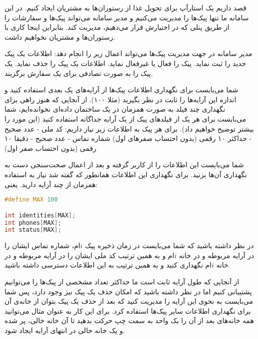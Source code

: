 \documentclass[../main.tex]{subfiles}
\begin{document}

قصد داریم یک استارآپ برای تحویل غذا از رستوران‌ها به مشتریان ایجاد کنیم. در این سامانه ما تنها پیک‌ها را مدیریت می‌کنیم و مدیر سامانه می‌تواند پیک‌ها و سفارشات را از طریق پنلی که در اختیارش قرار می‌دهیم، مدیریت کند.
بنابراین اینجا کاری با رستوران‌ها و مشتریان نخواهیم داشت.

مدیر سامانه در جهت مدیریت پیک‌ها می‌تواند اعمال زیر را انجام دهد:
 اطلاعات یک پیک جدید را ثبت نماید.
 پیک را فعال یا غیرفعال نماید.
 اطلاعات یک پیک را حذف نماید.
 یک پیک را به صورت تصادفی برای یک سفارش برگزیند.

شما می‌بایست برای نگهداری اطلاعات پیک‌ها از آرایه‌های یک بعدی استفاده کنید و اندازه این آرایه‌ها را ثابت در نظر بگیرید (مثلا ۱۰۰). از آنجایی که هنوز راهی برای نگهداری چند فیلد به صورت همزمان در یک ساختمان داده‌ای نخوانده‌ایم، شما می‌بایست برای هر یک از فیلدهای پیک از یک آرایه جداگانه استفاده کنید (این مورد را بیشتر توضیح خواهیم داد).
برای هر پیک به اطلاعات زیر نیاز داریم:
 کد ملی - عدد صحیح - حداکثر ۱۰ رقمی (بدون احتساب صفرهای اول)
 شماره تماس - عدد صحیح - دقیقا ۱۰ رقمی (بدون احتساب صفر اول)

شما می‌بایست این اطلاعات را از کاربر گرفته و بعد از اعمال صحت‌سنجی دست به نگهداری آن‌ها بزنید. برای نگهداری این اطلاعات همانطور که گفته شد نیاز به استفاده همزمان از چند آرایه دارید. یعنی:
\begin{latin}
\begin{lstlisting}[language=c]
#define MAX 100

int identities[MAX];
int phones[MAX];
int status[MAX];
\end{lstlisting}
\end{latin}

در نظر داشته باشید که شما می‌بایست در زمان ذخیره پیک $i$ام، شماره تماس ایشان را در آرایه مربوطه و در خانه $i$ام و به همین ترتیب کد ملی ایشان را در آرایه مربوطه و در خانه $i$ام نگهداری کنید و به همین ترتیب به این اطلاعات دسترسی داشته باشید.

از آنجایی که طول آرایه ثابت است ما حداکثر تعداد مشخصی از پیک‌ها را می‌توانیم پشتیبانی کنیم اما در نظر داشته باشید که امکان حذف یک پیک نیز وجود دارد، پس شما می‌بایست به نحوی این آرایه را مدیریت کنید که بعد از حذف یک پیک بتوان از خانه‌ی آن برای نگهداری اطلاعات سایر پیک‌ها استفاده کرد.
برای این کار به عنوان مثال می‌توانید همه خانه‌های بعد از آن را یک واحد به سمت چپ حرکت بدهید تا آن خانه خالی، پر شده و یک خانه خالی در انتهای آرایه ایجاد شود.
\end{document}

